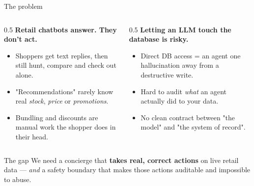 \documentclass[aspectratio=169,11pt]{beamer}
\begin{document}
\begin{frame}{The problem}
\begin{columns}[T]
\begin{column}{0.5\textwidth}
  \textbf{\color{macyred}Retail chatbots answer. They don't act.}
  \begin{itemize}
    \item Shoppers get text replies, then still hunt, compare and check out alone.
    \item "Recommendations" rarely know real \textit{stock}, \textit{price} or \textit{promotions}.
    \item Bundling and discounts are manual work the shopper does in their head.
  \end{itemize}
\end{column}
\begin{column}{0.5\textwidth}
  \textbf{\color{macyred}Letting an LLM touch the database is risky.}
  \begin{itemize}
    \item Direct DB access = an agent one hallucination away from a destructive write.
    \item Hard to audit \emph{what} an agent actually did to your data.
    \item No clean contract between "the model" and "the system of record".
  \end{itemize}
\end{column}
\end{columns}
\vfill
\begin{block}{The gap}
We need a concierge that \textbf{takes real, correct actions} on live retail data ---
\emph{and} a safety boundary that makes those actions auditable and impossible to abuse.
\end{block}
\end{frame}
\end{document}
